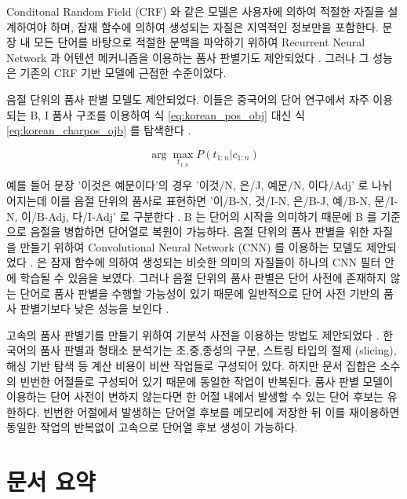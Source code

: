 \documentclass[oneside, ko,phd]{snuthesis_utf8_kor}
\begin{document}
Conditonal Random Field (CRF) 와 같은 모델은 사용자에 의하여 적절한 자질을 설계하여야 하며, 잠재 함수에 의하여 생성되는 자질은 지역적인 정보만을 포함한다.
문장 내 모든 단어를 바탕으로 적절한 문맥을 파악하기 위하여 Recurrent Neural Network 과 어텐션 메커니즘을 이용하는 품사 판별기도 제안되었다 \cite{lee2016sequence}.
그러나 그 성능은 기존의 CRF 기반 모델에 근접한 수준이었다.


음절 단위의 품사 판별 모델도 제안되었다.
이들은 중국어의 단어 연구에서 자주 이용되는 B, I 품사 구조를 이용하여 식 \ref{eq:korean_pos_obj} 대신 식 \ref{eq:korean_charpos_ojb} 를 탐색한다 \cite{zhao2006improved}.

\begin{equation}
\label{eq:korean_charpos_ojb}
\arg \max_{t_{1:n}} P(t_{1:n} \vert c_{1:n})
\end{equation}

예를 들어 문장 '이것은 예문이다'의 경우 '이것/N, 은/J, 예문/N, 이다/Adj' 로 나뉘어지는데 이를 음절 단위의 품사로 표현하면 '이/B-N, 것/I-N, 은/B-J, 예/B-N, 문/I-N, 이/B-Adj, 다/I-Adj' 로 구분한다 \cite{shim2004syllablekor, shim2011morpheme, kim2018bidirectional}.
B 는 단어의 시작을 의미하기 때문에 B 를 기준으로 음절을 병합하면 단어열로 복원이 가능하다.
음절 단위의 품사 판별을 위한 자질을 만들기 위하여 Convolutional Neural Network (CNN) 를 이용하는 모델도 제안되었다 \cite{kakao2018pos}.
\cite{kakao2018pos} 은 잠재 함수에 의하여 생성되는 비슷한 의미의 자질들이 하나의 CNN 필터 안에 학습될 수 있음을 보였다.
그러나 음절 단위의 품사 판별은 단어 사전에 존재하지 않는 단어로 품사 판별을 수행할 가능성이 있기 때문에 일반적으로 단어 사전 기반의 품사 판별기보다 낮은 성능을 보인다 \cite{ng2004chinese, shi2007dual, zhang2008joint, lee2016sequence, kakao2018pos}.

고속의 품사 판별기를 만들기 위하여 기분석 사전을 이용하는 방법도 제안되었다 \cite{lee2016preanalyzed, shim2016preanalyzed}.
한국어의 품사 판별과 형태소 분석기는 초,중,종성의 구분, 스트링 타입의 절제 (slicing), 해싱 기반 탐색 등 계산 비용이 비싼 작업들로 구성되어 있다.
하지만 문서 집합은 소수의 빈번한 어절들로 구성되어 있기 때문에 동일한 작업이 반복된다.
품사 판별 모델이 이용하는 단어 사전이 변하지 않는다면 한 어절 내에서 발생할 수 있는 단어 후보는 유한하다.
빈번한 어절에서 발생하는 단어열 후보를 메모리에 저장한 뒤 이를 재이용하면 동일한 작업의 반복없이 고속으로 단어열 후보 생성이 가능하다.

\section{문서 요약}
\end{document}
